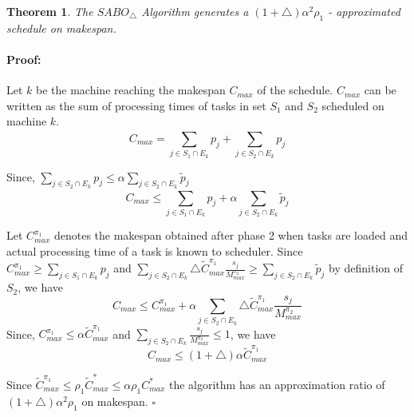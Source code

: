 \documentclass[12pt]{article}
\theoremstyle{mystyle}
\newtheorem{theorem}{Theorem}
\newenvironment{myproof}{\paragraph{Proof:}}{\hfill$\square$}
\begin{document}
                             
                            
                            \begin{theorem}
                            \label{th:chapter5-2a}
                             The $SABO_\triangle$ Algorithm generates a $(1+\triangle)\alpha^2 \rho_1$ - approximated schedule on makespan.
                            \end{theorem}         
                            \begin{myproof}
                            Let $k$ be the machine reaching the makespan $C_{max}$ of the schedule. $C_{max}$ can be written as the sum of processing times of tasks in set $S_1$ and $S_2$ scheduled on machine $k$.
                            \begin{equation}\nonumber
                      C_{max}= \sum_{j \in S_1 \cap E_k}^{}p_j+\sum_{j \in S_2 \cap E_k}^{}p_j 
                            \end{equation}
                            
                            Since, $\sum\limits
                            _{j \in S_2 \cap E_k}^{}p_j\leq\alpha\sum\limits
                            _{j \in S_2 \cap E_k} \tilde{p}_j$
                              \begin{equation}\nonumber
                              C_{max} \leq \sum_{j \in S_1 \cap E_k}^{}p_j+\alpha\sum_{j \in S_2 \cap E_k} \tilde{p}_j 
                                    \end{equation}
                           
                            
                            Let $C^{\pi_1}_{max}$ denotes the makespan obtained after phase 2 when tasks are loaded and actual processing time of a task is known to scheduler. Since $C^{\pi_1}_{max} \geq \sum\limits
                            _{j \in S_1 \cap E_k}^{}p_j$ and $\sum\limits
                            _{j \in S_2\cap E_k}\triangle {\tilde{C}^{\pi_1}_{max}} \frac{s_j}{M^{\pi_2}_{max}}\geq \sum\limits
                            _{j \in S_2\cap E_k}^{}\tilde{p}_j $ by definition of $S_2$, we have
            \begin{equation}\nonumber
        C_{max}\leq C^{\pi_1}_{max}+\alpha\sum_{j \in S_2\cap E_k}^{}\triangle {\tilde{C}^{\pi_1}_{max}} \frac{s_j}{M^{\pi_2}_{max}}
                                   \end{equation}                    
          Since, $C^{\pi_1}_{max}\leq\alpha\tilde{C}^{\pi_1}_{max}$ and $\sum\limits_{j \in S_2\cap E_k} \frac{s_j}{M^{\pi_2}_{max}}\leq 1$, we have
            \begin{equation}\nonumber                       C_{max}\leq(1+\triangle)\alpha\tilde{C}^{\pi_1}_{max}                         \end{equation}
         
        Since $ \tilde{C}^{\pi_1}_{max} \leq \rho_1 \tilde{C}^{*}_{max}\leq \alpha\rho_1 {C}^{*}_{max}$ the algorithm has an approximation ratio of $(1+\triangle)\alpha^2 \rho_1$ on makespan.
                                \end{myproof}
\end{document}
